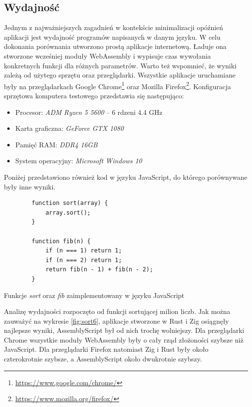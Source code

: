 \documentclass[language=polish,type=master]{aghmodern}
\begin{document}
\subsection{Wydajność}
Jednym z najważniejszych zagadnień w kontekście minimalizacji opóźnień aplikacji jest wydajność programów napisanych w danym języku.
W celu dokonania porównania utworzono prostą aplikacje internetową.
Ładuje ona stworzone wcześniej moduły WebAssembly i wypisuje czas wywołania konkretnych funkcji dla różnych parametrów.
Warto też wspomnieć, że wyniki zależą od użytego sprzętu oraz przeglądarki.
Wszystkie aplikacje uruchamiane były na przeglądarkach Google Chrome\footnote{\url{https://www.google.com/chrome/}} oraz Mozilla Firefox\footnote{\url{https://www.mozilla.org/firefox/}}.
Konfiguracja sprzętowa komputera testowego przedstawia się następująco:
\begin{itemize}
    \itemsep0em
    \item Procesor: \emph{ADM Ryzen 5 5600} -- 6 rdzeni 4.4 GHz
    \item Karta graficzna: \emph{GeForce GTX 1080}
    \item Pamięć RAM: \emph{DDR4 16GB}
    \item System operacyjny: \emph{Microsoft Windows 10}
\end{itemize}

Poniżej przedstawiono również kod w języku JavaScript, do którego porównywane były inne wyniki.

\begin{listing}[H]
    \begin{verbatim}
        function sort(array) {
            array.sort();
        }

        function fib(n) {
            if (n === 1) return 1;
            if (n === 2) return 1;
            return fib(n - 1) + fib(n - 2); 
        }
    \end{verbatim}
    \caption{Funkcje \emph{sort} oraz \emph{fib} zaimplementowany w języku JavaScript}
\end{listing}

Analizę wydajności rozpoczęto od funkcji sortującej milion liczb.
Jak można zauważyć na wykresie \ref{fig:sort6}, aplikacje stworzone w Rust i Zig osiągnęły najlepsze wyniki, AssemblyScript był od nich trochę wolniejszy.
Dla przeglądarki Chrome wszystkie moduły WebAssembly były o cały rząd złożoności szybsze niż JavaScript.
Dla przeglądarki Firefox natomiast Zig i Rust były około czterokrotnie szybsze, a AssemblyScript około dwukrotnie szybszy.
\end{document}
